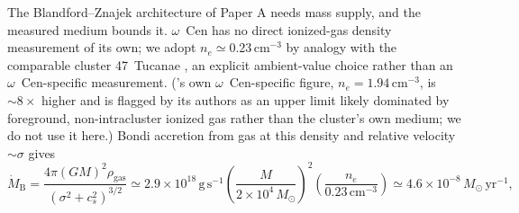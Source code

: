 \documentclass[11pt]{article}
\newcommand{\msun}{\ensuremath{M_\odot}}
\newcommand{\ocen}{\ensuremath{\omega}~Cen}
\begin{document}
The Blandford--Znajek architecture of Paper A needs mass supply, and the measured medium bounds it. \ocen{} has no direct ionized-gas density measurement of its own; we adopt $n_{e} \simeq 0.23\,\mathrm{cm^{-3}}$ by analogy with the comparable cluster 47~Tucanae \citep{Abbate2018}, an explicit ambient-value choice rather than an \ocen{}-specific measurement. (\citealt{oMEGACatVII2025}'s own \ocen{}-specific figure, $n_{e} = 1.94\,\mathrm{cm^{-3}}$, is $\sim8\times$ higher and is flagged by its authors as an upper limit likely dominated by foreground, non-intracluster ionized gas rather than the cluster's own medium; we do not use it here.) Bondi accretion from gas at this density and relative velocity $\sim \sigma$ gives
\begin{equation}
\dot{M}_{\mathrm{B}} = \frac{4\pi (GM)^{2}\rho_{\mathrm{gas}}}{(\sigma^{2}+c_{s}^{2})^{3/2}}
\simeq 2.9\times10^{18}\,\mathrm{g\,s^{-1}}
\left(\frac{M}{2\times10^{4}\,\msun}\right)^{2}
\left(\frac{n_{e}}{0.23\,\mathrm{cm^{-3}}}\right)
\simeq 4.6\times10^{-8}\,\msun\,\mathrm{yr^{-1}},
\label{eq:bondi}
\end{equation}
\end{document}
